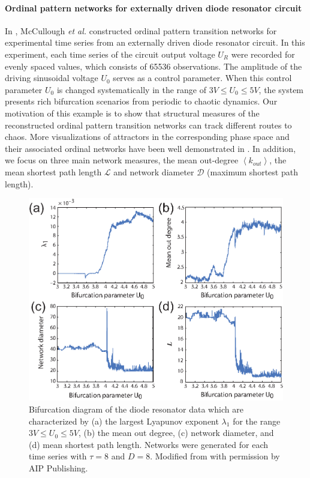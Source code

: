 	\paragraph{Ordinal pattern networks for externally driven diode resonator circuit}
	In \cite{McCullough2015}, McCullough {\textit{et al.}} constructed ordinal pattern transition networks for experimental time series from an externally driven diode resonator circuit. In this experiment, each time series of the circuit output voltage $U_R$ were recorded for evenly spaced values, which consists of 65536 observations. The amplitude of the driving sinusoidal voltage $U_0$ serves as a control parameter. When this control parameter $U_0$  is changed systematically in the range of $3V \leq U_0 \leq 5V$, the system presents rich bifurcation scenarios from periodic to chaotic dynamics. Our motivation of this example is to show that structural measures of the reconstructed ordinal pattern transition networks can track different routes to chaos. More visualizations of attractors in the corresponding phase space and their associated ordinal networks have been well demonstrated in \cite{McCullough2015}. In addition, we focus on three main network measures, the mean out-degree $\left < k_{out} \right >$, the mean shortest path length $\mathcal{L}$ and network diameter $\mathcal{D}$ (maximum shortest path length).
	\begin{figure}
	\centering
		\includegraphics[width=0.8\columnwidth]{Chapter06_Applications/appl_transition_network.eps}
	\caption{Bifurcation diagram of the diode resonator data which are characterized by (a) the largest Lyapunov exponent $\lambda_1$ for the range $3V \leq U_0 \leq 5V$, (b) the mean out degree, (c) network diameter, and (d) mean shortest path length. Networks were generated for each time series with $\tau = 8$ and $D=8$. Modified from \cite{McCullough2015} with permission by AIP Publishing. } \label{fig:appl_transition_network}
	\end{figure}

